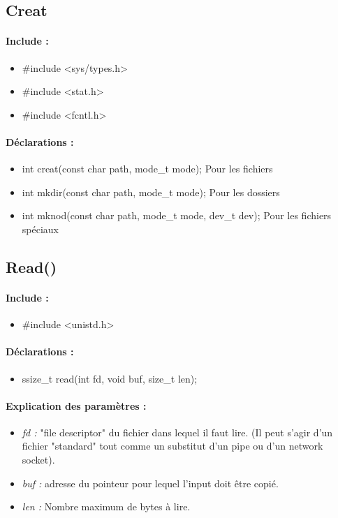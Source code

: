 \documentclass{article}[12pt]
\begin{document}
\subsection{Creat}
\paragraph{Include : }
\begin{itemize}
	\item \#include <sys/types.h>
	\item \#include <stat.h>
	\item \#include <fcntl.h>
\end{itemize}
\paragraph{Déclarations : }
\begin{itemize}
	\item int creat(const char \* path, mode\_t mode); Pour les fichiers
	\item int mkdir(const char \* path, mode\_t mode); Pour les dossiers
	\item int mknod(const char \* path, mode\_t mode, dev\_t dev); Pour les fichiers spéciaux
\end{itemize}
\subsection{Read()}
\paragraph{Include : }
\begin{itemize}
	\item \#include <unistd.h>
\end{itemize}
\paragraph{Déclarations : }
\begin{itemize}
	\item ssize\_t read(int fd, void \* buf, size\_t len);
\end{itemize}
\paragraph{Explication des paramètres : }
\begin{itemize}
	\item \emph{fd : } "file descriptor" du fichier dans lequel il faut lire. (Il peut s'agir d'un fichier "standard" tout comme un substitut d'un pipe ou d'un network socket).
	\item \emph{buf : } adresse du pointeur pour lequel l'input doit être copié.
	\item \emph{len : } Nombre maximum de bytes à lire.
\end{itemize}
\end{document}
